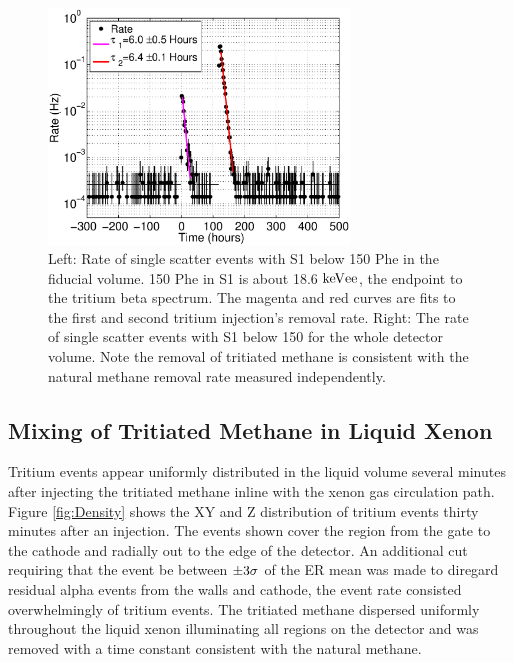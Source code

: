 \begin{figure}[h!]\centering
\includegraphics[width=80mm]{CH3T_Rate_fid_150_Run03_Tritium_Rate.eps}
\caption{Left: Rate of single scatter events with S1 below 150 Phe in the fiducial volume. 150 Phe in S1 is about 18.6 $\rm keV{ee}$, the endpoint to the tritium beta spectrum. The magenta and red curves are fits to the first and second tritium injection's removal rate. Right: The rate of single scatter events with S1 below 150 for the whole detector volume. Note the removal of tritiated methane is consistent with the natural methane removal rate measured independently.}
\label{fig:Removal}
\end{figure}


\subsection{Mixing of Tritiated Methane in Liquid Xenon}

Tritium events appear uniformly distributed in the liquid volume several minutes after injecting the tritiated methane inline with the xenon gas circulation path. Figure \ref{fig:Density} shows the XY and Z distribution of tritium events thirty minutes after an injection. The events shown cover the region from the gate to the cathode and radially out to the edge of the detector. An additional cut requiring that the event be between $\rm \pm 3 \sigma$ of the ER mean was made to diregard residual alpha events from the walls and cathode, the event rate consisted overwhelmingly of tritium events. The tritiated methane dispersed uniformly throughout the liquid xenon illuminating all regions on the detector and was removed with a time constant consistent with the natural methane. 
 
